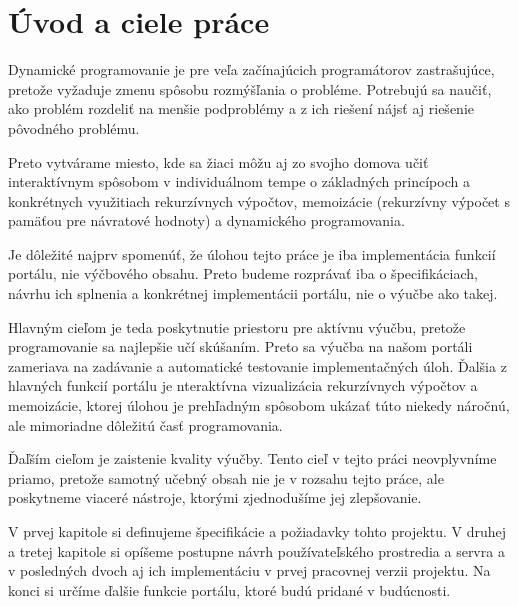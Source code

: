 \chapter*{Úvod a ciele práce}
Dynamické programovanie je pre veľa začínajúcich programátorov zastrašujúce,
pretože vyžaduje zmenu spôsobu rozmýšľania o probléme. Potrebujú sa naučiť,
ako problém rozdeliť na menšie podproblémy a z ich riešení nájsť aj riešenie
pôvodného problému.

Preto vytvárame miesto, kde sa žiaci môžu aj zo svojho domova učiť interaktívnym spôsobom v individuálnom tempe
o základných princípoch a konkrétnych využitiach rekurzívnych výpočtov, memoizácie
(rekurzívny výpočet s pamäťou pre návratové hodnoty) a dynamického programovania.

Je dôležité najprv spomenúť, že úlohou tejto práce je iba implementácia funkcií portálu, nie výčbového
obsahu. Preto budeme rozprávať iba o špecifikáciach, návrhu ich splnenia a konkrétnej implementácii portálu,
nie o výučbe ako takej.

Hlavným cieľom je teda poskytnutie priestoru pre aktívnu výučbu,
pretože programovanie sa najlepšie učí skúšaním. Preto sa výučba na našom portáli zameriava na
zadávanie a automatické testovanie implementačných úloh. Ďalšia z hlavných funkcií portálu je
nteraktívna vizualizácia rekurzívnych výpočtov a memoizácie, ktorej úlohou je prehľadným spôsobom ukázať túto niekedy
náročnú, ale mimoriadne dôležitú časť programovania.

Ďaľším cieľom je zaistenie kvality výučby. Tento cieľ v tejto práci neovplyvníme
priamo, pretože samotný učebný obsah nie je v rozsahu tejto práce, ale poskytneme
viaceré nástroje, ktorými zjednodušíme jej zlepšovanie.

V prvej kapitole si definujeme špecifikácie a požiadavky tohto projektu.
V druhej a tretej kapitole si opíšeme postupne návrh používateľského prostredia a servra
a v posledných dvoch aj ich implementáciu v prvej pracovnej verzii projektu.
Na konci si určíme ďalšie funkcie portálu, ktoré budú pridané v budúcnosti.
